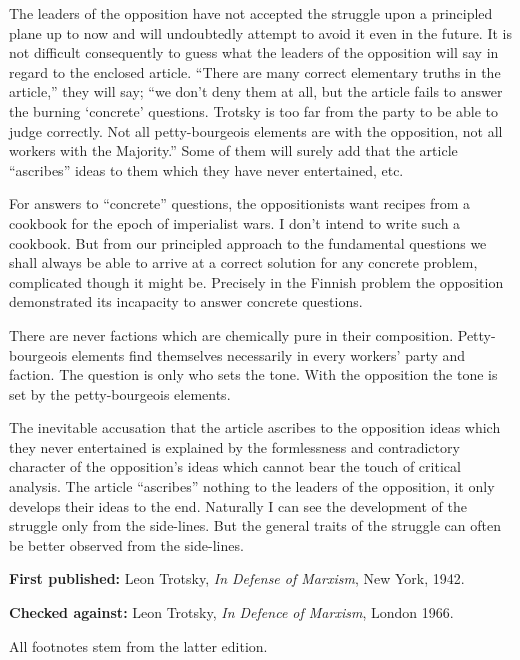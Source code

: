 

The leaders of the opposition have not accepted the struggle upon a principled plane up to now and will undoubtedly attempt to avoid it even in the future. It is not difficult consequently to guess what the leaders of the opposition will say in regard to the enclosed article. “There are many correct elementary truths in the article,” they will say; “we don’t deny them at all, but the article fails to answer the burning ‘concrete’ questions. Trotsky is too far from the party to be able to judge correctly. Not all petty-bourgeois elements are with the opposition, not all workers with the Majority.” Some of them will surely add that the article “ascribes” ideas to them which they have never entertained, etc.

For answers to “concrete” questions, the oppositionists want recipes from a cookbook for the epoch of imperialist wars. I don’t intend to write such a cookbook. But from our principled approach to the fundamental questions we shall always be able to arrive at a correct solution for any concrete problem, complicated though it might be. Precisely in the Finnish problem the opposition demonstrated its incapacity to answer concrete questions.

There are never factions which are chemically pure in their composition. Petty-bourgeois elements find themselves necessarily in every workers’ party and faction. The question is only who sets the tone. With the opposition the tone is set by the petty-bourgeois elements.

The inevitable accusation that the article ascribes to the opposition ideas which they never entertained is explained by the formlessness and contradictory character of the opposition’s ideas which cannot bear the touch of critical analysis. The article “ascribes” nothing to the leaders of the opposition, it only develops their ideas to the end. Naturally I can see the development of the struggle only from the side-lines. But the general traits of the struggle can often be better observed from the side-lines.


\begin{letterinfo}
	\textbf{First published:} Leon Trotsky, \emph{In Defense of Marxism}, New York, 1942.
	
	\textbf{Checked against:} Leon Trotsky, \emph{In Defence of Marxism}, London 1966.
	
	All footnotes stem from the latter edition.
\end{letterinfo}
